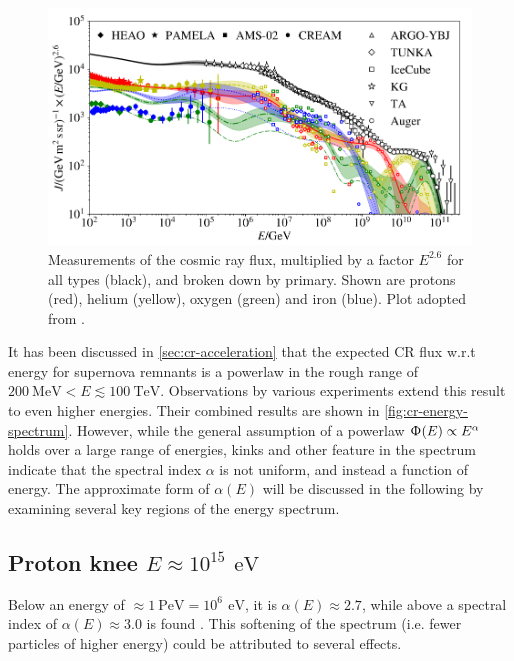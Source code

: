 \begin{figure}
	\centering
	\includegraphics[width=1\textwidth]{./plots/cosmic_ray_spectrum.png}
	\caption{Measurements of the cosmic ray flux, multiplied by a factor $E^{2.6}$ for all types (black), and broken down by primary. Shown are protons (red), 
	helium (yellow), oxygen (green) and iron (blue). Plot adopted from \cite{dembinski2017data}.}
	\label{fig:cr-energy-spectrum}
\end{figure}

It has been discussed in \autoref{sec:cr-acceleration} that the expected CR flux w.r.t energy for supernova remnants is a powerlaw in the rough range of 
$\SI{200}{\mega\electronvolt} < E \lesssim \SI{100}{\tera\electronvolt}$. Observations by various experiments extend this result to even higher energies. Their 
combined results are shown in \autoref{fig:cr-energy-spectrum}. However, while the general assumption of a powerlaw $\Upphi(E)\propto E^\alpha$ holds over a large
range of energies, kinks and other feature in the spectrum indicate that the spectral index $\alpha$ is not uniform, and instead a function of energy. The 
approximate form of $\alpha(E)$ will be discussed in the following by examining several key regions of the energy spectrum. 

\subsection{Proton knee $E\approx 10^{15}\,\SI{}{\electronvolt}$}
\label{ssec:cr-proton-knee}

Below an energy of $\approx \SI{1}{\peta\electronvolt} = 10^6\,\SI{}{\electronvolt}$, it is $\alpha(E)\approx 2.7$, while above a spectral index of 
$\alpha(E)\approx 3.0$ is found \cite{gaisser2016cosmic}. This softening of the spectrum (i.e. fewer particles of higher energy) could be attributed to several
effects.

